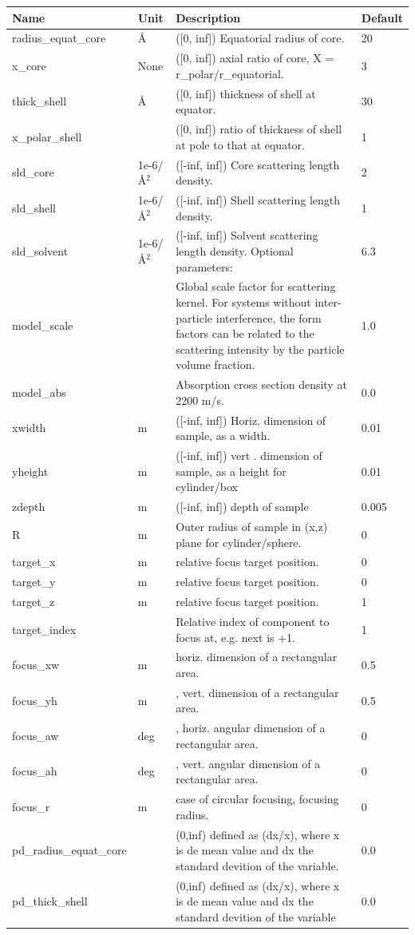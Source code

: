 \begin{longtable}{p{}p{}p{}p{}}
\toprule
\textbf{Name} & \textbf{Unit} & \textbf{Description} & \textbf{Default} \\
\midrule
\endhead
radius\_equat\_core & \AA{} & ([0, inf]) Equatorial radius of core. & 20 \\
x\_core & None & ([0, inf]) axial ratio of core, X = r\_polar/r\_equatorial. & 3 \\
thick\_shell & \AA{} & ([0, inf]) thickness of shell at equator. & 30 \\
x\_polar\_shell &  & ([0, inf]) ratio of thickness of shell at pole to that at equator. & 1 \\
sld\_core & 1e-6/\AA{}$^{2}$ & ([-inf, inf]) Core scattering length density. & 2 \\
sld\_shell & 1e-6/\AA{}$^{2}$ & ([-inf, inf]) Shell scattering length density. & 1 \\
sld\_solvent & 1e-6/\AA{}$^{2}$ & ([-inf, inf]) Solvent scattering length density. Optional parameters: & 6.3 \\
model\_scale &   & Global scale factor for scattering kernel. For systems without inter-particle interference, the form factors can be related to the scattering intensity by the particle volume fraction. & 1.0 \\
model\_abs &   & Absorption cross section density at 2200 m/s. & 0.0 \\
xwidth & m & ([-inf, inf]) Horiz. dimension of sample, as a width. & 0.01 \\
yheight & m & ([-inf, inf]) vert . dimension of sample, as a height for cylinder/box & 0.01 \\
zdepth & m & ([-inf, inf]) depth of sample & 0.005 \\
R & m & Outer radius of sample in (x,z) plane for cylinder/sphere. & 0 \\
target\_x & m & relative focus target position. & 0 \\
target\_y & m & relative focus target position. & 0 \\
target\_z & m & relative focus target position. & 1 \\
target\_index &   & Relative index of component to focus at, e.g. next is +1. & 1 \\
focus\_xw & m & horiz. dimension of a rectangular area. & 0.5 \\
focus\_yh & m & , vert. dimension of a rectangular area. & 0.5 \\
focus\_aw & deg & , horiz. angular dimension of a rectangular area. & 0 \\
focus\_ah & deg & , vert. angular dimension of a rectangular area. & 0 \\
focus\_r & m & case of circular focusing, focusing radius. & 0 \\
pd\_radius\_equat\_core &  & (0,inf) defined as (dx/x), where x is de mean value and dx the standard devition of the variable. & 0.0 \\
pd\_thick\_shell &  & (0,inf) defined as (dx/x), where x is de mean value and dx the standard devition of the variable & 0.0 \\
\bottomrule
\end{longtable}

